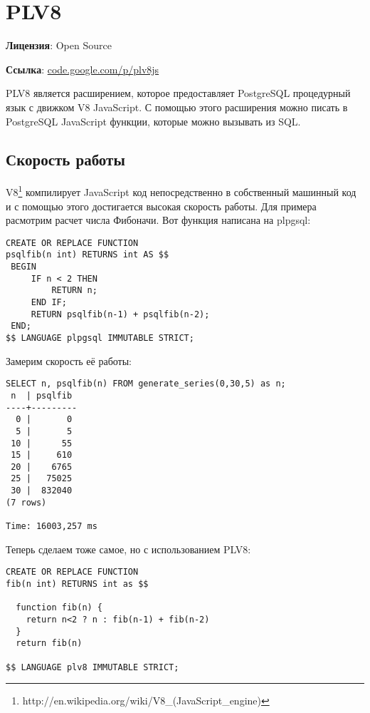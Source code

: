 \section{PLV8}
\textbf{Лицензия}: Open Source

\textbf{Ссылка}: \href{http://code.google.com/p/plv8js/}{code.google.com/p/plv8js}

PLV8 является расширением, которое предоставляет PostgreSQL процедурный язык с движком V8 JavaScript. С помощью этого расширения можно писать в PostgreSQL JavaScript функции, которые можно вызывать из SQL.

\subsection{Скорость работы}

V8\footnote{http://en.wikipedia.org/wiki/V8\_(JavaScript\_engine)} компилирует JavaScript код непосредственно в собственный машинный код и с помощью этого достигается высокая скорость работы. Для примера расмотрим расчет числа Фибоначи. Вот функция написана на plpgsql:

\begin{lstlisting}[label=lst:plv8js1,caption=Фибоначи на plpgsql]
CREATE OR REPLACE FUNCTION
psqlfib(n int) RETURNS int AS $$
 BEGIN
     IF n < 2 THEN
         RETURN n;
     END IF;
     RETURN psqlfib(n-1) + psqlfib(n-2);
 END;
$$ LANGUAGE plpgsql IMMUTABLE STRICT;
\end{lstlisting}

Замерим скорость её работы:

\begin{lstlisting}[label=lst:plv8js2,caption=Скорость расчета числа Фибоначи на plpgsql]
SELECT n, psqlfib(n) FROM generate_series(0,30,5) as n;
 n  | psqlfib 
----+---------
  0 |       0
  5 |       5
 10 |      55
 15 |     610
 20 |    6765
 25 |   75025
 30 |  832040
(7 rows)

Time: 16003,257 ms
\end{lstlisting}

Теперь сделаем тоже самое, но с использованием PLV8:

\begin{lstlisting}[label=lst:plv8js3,caption=Фибоначи на plv8]
CREATE OR REPLACE FUNCTION
fib(n int) RETURNS int as $$

  function fib(n) {
    return n<2 ? n : fib(n-1) + fib(n-2)
  }
  return fib(n)

$$ LANGUAGE plv8 IMMUTABLE STRICT;
\end{lstlisting}

